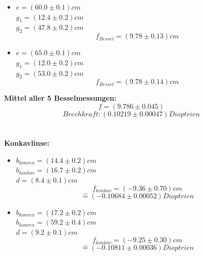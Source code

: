 \documentclass[12pt,a4paper]{article}
\begin{document}
\begin{multicols}{2}
\begin{itemize}
	\item $e=(60.0 \pm 0.1)cm$\\
	\indent $g_1= (12.4 \pm 0.2) cm$\\
	$g_2 = (47.8 \pm 0.2)cm$
	$$f_{Bessel}=(9.78 \pm 0.13) cm$$
	
	\item $e=(65.0 \pm 0.1)cm$\\
	\indent $g_1 = (12.0 \pm 0.2) cm$\\
	$g_2 =(53.0 \pm 0.2)cm$
	$$f_{Bessel} = (9.78 \pm 0.14)cm$$

\end{itemize}

\textbf{Mittel aller 5 Besselmessungen:}\\
$$f=(9.786 \pm 0.045)$$
$$Brechkraft: (0.10219 \pm 0.00047) Dioptrien$$\\
\\
\textbf{Konkavlinse:}
\begin{itemize}
	\item $b_{konvex}=(14.4 \pm 0.2) cm$\\
	$b_{konkav}=(16.7 \pm 0.2)cm$\\
	$d=(8.4 \pm 0.1)cm$
	$$f_{konkav}= (-9.36 \pm 0.70)cm$$
	$$\widehat{=}(-0.10684 \pm 0.00052)Dioptrien$$
	
	\item $b_{konvex}=(17.2 \pm 0.2)cm$\\
	$b_{konvex}=(59.2 \pm 0.4)cm$\\
	$d=(9.2 \pm 0.1)cm$
	$$f_{konkav}= (-9.25 \pm 0.30)cm$$
	$$\widehat{=}(-0.10811 \pm 0.00036)Dioptrien$$
	
	
\end{itemize}





\end{multicols}
\end{document}
